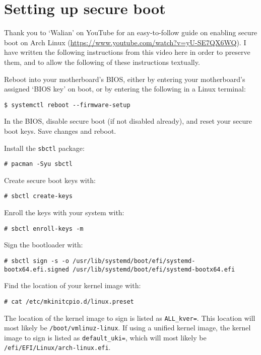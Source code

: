 \documentclass[a4paper]{article}
\begin{document}
\section{Setting up secure boot}

Thank you to `Walian' on YouTube for an easy-to-follow guide on enabling secure boot on Arch Linux (\url{https://www.youtube.com/watch?v=yU-SE7QX6WQ}).
I have written the following instructions from this video here in order to preserve them, and to allow the following of these instructions textually.

Reboot into your motherboard's BIOS, either by entering your motherboard's assigned `BIOS key' on boot, or by entering the following in a Linux terminal:
\begin{lstlisting}
$ systemctl reboot --firmware-setup
\end{lstlisting}

In the BIOS, disable secure boot (if not disabled already), and reset your secure boot keys.
Save changes and reboot.

Install the \lstinline|sbctl| package:
\begin{lstlisting}
# pacman -Syu sbctl
\end{lstlisting}

Create secure boot keys with:
\begin{lstlisting}
# sbctl create-keys
\end{lstlisting}

Enroll the keys with your system with:
\begin{lstlisting}
# sbctl enroll-keys -m
\end{lstlisting}

Sign the bootloader with:
\begin{lstlisting}
# sbctl sign -s -o /usr/lib/systemd/boot/efi/systemd-bootx64.efi.signed /usr/lib/systemd/boot/efi/systemd-bootx64.efi
\end{lstlisting}

Find the location of your kernel image with:
\begin{lstlisting}
# cat /etc/mkinitcpio.d/linux.preset 
\end{lstlisting}

The location of the kernel image to sign is listed as \lstinline|ALL_kver=|.
This location will most likely be \lstinline|/boot/vmlinuz-linux|.
If using a unified kernel image, the kernel image to sign is listed as \lstinline|default_uki=|, which will most likely be \lstinline|/efi/EFI/Linux/arch-linux.efi|.
\end{document}
